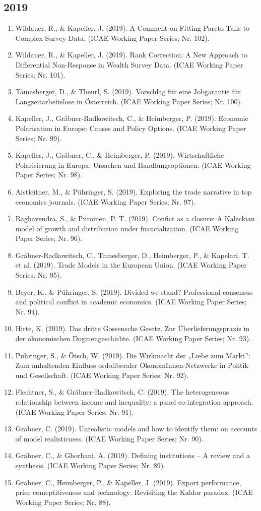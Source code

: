 \subsection*{2019}
\begin{enumerate}
	 \item Wildauer, R., \& Kapeller, J. (2019). A Comment on Fitting Pareto Tails to Complex Survey Data. (ICAE Working Paper Series; Nr. 102).
	 \item Wildauer, R., \& Kapeller, J. (2019). Rank Correction: A New Approach to Differential Non-Response in Wealth Survey Data. (ICAE Working Paper Series; Nr. 101).
	 \item Tamesberger, D., \& Theurl, S. (2019). Vorschlag für eine Jobgarantie für Langzeitarbeitslose in Österreich. (ICAE Working Paper Series; Nr. 100).
	 \item Kapeller, J., Gräbner-Radkowitsch, C., \& Heimberger, P. (2019). Economic Polarisation in Europe: Causes and Policy Options. (ICAE Working Paper Series; Nr. 99).
	 \item Kapeller, J., Gräbner, C., \& Heimberger, P. (2019). Wirtschaftliche Polarisierung in Europa: Ursachen und Handlungsoptionen. (ICAE Working Paper Series; Nr. 98).
	 \item Aistleitner, M., \& Pühringer, S. (2019). Exploring the trade narrative in top economics journals. (ICAE Working Paper Series; Nr. 97).
	 \item Raghavendra, S., \& Piiroinen, P. T. (2019). Confict as a closure: A Kaleckian model of growth and distribution under fnancialization. (ICAE Working Paper Series; Nr. 96).
	 \item Gräbner-Radkowitsch, C., Tamesberger, D., Heimberger, P., \& Kapelari, T. et al. (2019). Trade Models in the European Union. (ICAE Working Paper Series; Nr. 95).
	 \item Beyer, K., \& Pühringer, S. (2019). Divided we stand? Professional consensus and political conflict in academic economics. (ICAE Working Paper Series; Nr. 94).
	 \item Hirte, K. (2019). Das dritte Gossensche Gesetz. Zur Überlieferungspraxis in der ökonomischen Dogmengeschichte. (ICAE Working Paper Series; Nr. 93).
	 \item Pühringer, S., \& Ötsch, W. (2019). Die Wirkmacht der „Liebe zum Markt”: Zum anhaltenden Einfluss ordoliberaler ÖkonomInnen-Netzwerke in Politik und Gesellschaft. (ICAE Working Paper Series; Nr. 92).
	 \item Flechtner, S., \& Gräbner-Radkowitsch, C. (2019). The heterogeneous relationship between income and inequality: a panel co-integration approach. (ICAE Working Paper Series; Nr. 91).
	 \item Gräbner, C. (2019). Unrealistic models and how to identify them: on accounts of model realisticness. (ICAE Working Paper Series; Nr. 90).
	 \item Gräbner, C., \& Ghorbani, A. (2019). Defining institutions -- A review and a synthesis. (ICAE Working Paper Series; Nr. 89).
	 \item Gräbner, C., Heimberger, P., \& Kapeller, J. (2019). Export performance, price comeptitiveness and technology: Revisiting the Kaldor paradox. (ICAE Working Paper Series; Nr. 88).
\end{enumerate}
